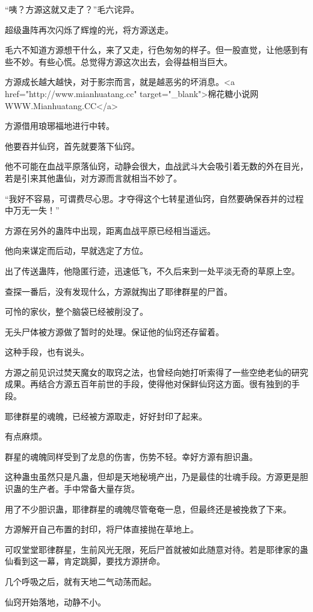 \begin{this_body}
“咦？方源这就又走了？”毛六诧异。

超级蛊阵再次闪烁了辉煌的光，将方源送走。

毛六不知道方源想干什么，来了又走，行色匆匆的样子。但一股直觉，让他感到有些不妙。有些心慌。总觉得方源这次出去，会得益相当巨大。

方源成长越大越快，对于影宗而言，就是越恶劣的坏消息。<a href="http://www.mianhuatang.cc" target="\_blank">棉花糖小说网WWW.Mianhuatang.CC</a>

方源借用琅琊福地进行中转。

他要吞并仙窍，首先就要落下仙窍。

他不可能在血战平原落仙窍，动静会很大，血战武斗大会吸引着无数的外在目光，若是引来其他蛊仙，对方源而言就相当不妙了。

“我好不容易，可谓费尽心思。才夺得这个七转星道仙窍，自然要确保吞并的过程中万无一失！”

方源在另外的蛊阵中出现，距离血战平原已经相当遥远。

他向来谋定而后动，早就选定了方位。

出了传送蛊阵，他隐匿行迹，迅速低飞，不久后来到一处平淡无奇的草原上空。

查探一番后，没有发现什么，方源就掏出了耶律群星的尸首。

可怜的家伙，整个脑袋已经被削没了。

无头尸体被方源做了暂时的处理。保证他的仙窍还存留着。

这种手段，也有说头。

方源之前见识过焚天魔女的取窍之法，也曾经向她打听索得了一些空绝老仙的研究成果。再结合方源五百年前世的手段，使得他对保鲜仙窍这方面。很有独到的手段。

耶律群星的魂魄，已经被方源取走，好好封印了起来。

有点麻烦。

群星的魂魄同样受到了龙息的伤害，伤势不轻。幸好方源有胆识蛊。

这种蛊虫虽然只是凡蛊，但却是天地秘境产出，乃是最佳的壮魂手段。方源更是胆识蛊的生产者。手中常备大量存货。

用了不少胆识蛊，耶律群星的魂魄尽管奄奄一息，但最终还是被挽救了下来。

方源解开自己布置的封印，将尸体直接抛在草地上。

可叹堂堂耶律群星，生前风光无限，死后尸首就被如此随意对待。若是耶律家的蛊仙看到这一幕，肯定跳脚，要找方源拼命。

几个呼吸之后，就有天地二气动荡而起。

仙窍开始落地，动静不小。


\end{this_body}
